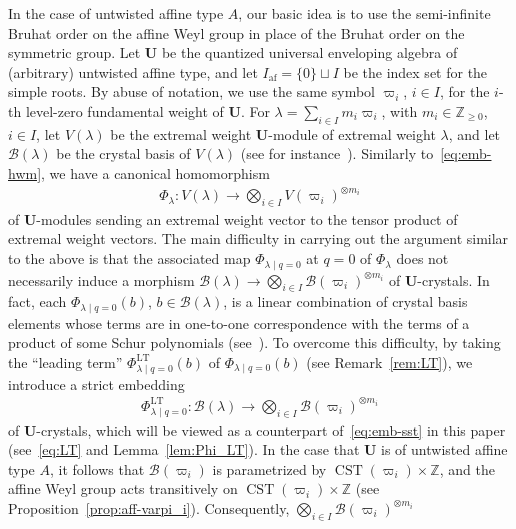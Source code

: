 \documentclass[ALCO,ThmDefs,Unicode,epreuves]{cedram}
\newcommand{\BZ}{\mathbb{Z}}
\renewcommand{\U}{\mathbf{U}}
\DeclareMathOperator{\af}{af}
\DeclareMathOperator{\LT}{LT}
\DeclareMathOperator{\CST}{CST}
\begin{document}
In the case of untwisted affine type $A$, 
our basic idea is to use 
the semi-infinite Bruhat order on the affine Weyl group 
in place of the Bruhat order on the symmetric group. 
Let 
$\U$ 
be the quantized universal enveloping algebra of (arbitrary) untwisted affine type, 
and let 
$I_{\af} = \{ 0 \} \sqcup I$
be the index set for the simple roots.
By abuse of notation, we use the same symbol 
$\varpi_i$, $i \in I$, 
for the $i$-th level-zero fundamental weight of $\U$. 
For 
$\lambda = \sum_{i \in I} m_i \varpi_i$, 
with 
$m_i \in \BZ_{\geq 0}$, $i \in I$, 
let 
$V(\lambda)$ 
be the extremal weight $\U$-module 
of extremal weight $\lambda$, 
and let 
$\mathcal{B}(\lambda)$ 
be the crystal basis of 
$V(\lambda)$ 
(see for instance~\cite[\S~3.1]{K02}). 
Similarly to~\eqref{eq:emb-hwm}, 
we have a canonical homomorphism 
\begin{align}
\Phi_{\lambda} : 
V(\lambda) 
\longrightarrow 
\bigotimes_{i \in I} V(\varpi_i)^{\otimes m_i}
\end{align}
of $\U$-modules sending an extremal weight vector to the tensor product of extremal weight vectors. 
The main difficulty in carrying out the argument similar to the above is that the associated map 
$\Phi_{\lambda \mid q=0}$ 
at 
$q = 0$ 
of 
$\Phi_{\lambda}$ 
does not necessarily induce a morphism 
$\mathcal{B}(\lambda) \rightarrow \bigotimes_{i \in I} \mathcal{B}(\varpi_i)^{\otimes m_i}$
of $\U$-crystals. 
In fact, each 
$\Phi_{\lambda \mid q=0}(b)$, 
$b \in \mathcal{B}(\lambda)$, 
is a linear combination of crystal basis elements 
whose terms are in one-to-one correspondence with 
the terms of a product of some Schur polynomials 
(see~\cite[\S~4.2]{BN04}). 
To overcome this difficulty, 
by taking the ``leading term'' 
$\Phi_{\lambda \mid q=0}^{\LT }(b)$ 
of 
$\Phi_{\lambda \mid q=0}(b)$
(see Remark~\ref{rem:LT}), 
we introduce a strict embedding 
\begin{align} \label{eq:intro-LT}
\Phi_{\lambda \mid q=0}^{\LT } : 
\mathcal{B}(\lambda) 
\longrightarrow 
\bigotimes_{i \in I} \mathcal{B}(\varpi_i)^{\otimes m_i}
\end{align}
of $\U$-crystals, 
which will be viewed as a counterpart of~\eqref{eq:emb-sst} in this paper 
(see~\eqref{eq:LT} and Lemma~\ref{lem:Phi_LT}). 
In the case that $\U$ is of untwisted affine type $A$, 
it follows that 
$\mathcal{B}(\varpi_i)$
is parametrized by 
$\CST (\varpi_i) \times \BZ$, 
and the affine Weyl group acts transitively on 
$\CST (\varpi_i) \times \BZ$ 
(see Proposition~\ref{prop:aff-varpi_i}). 
Consequently, 
$\bigotimes_{i \in I} \mathcal{B}(\varpi_i)^{\otimes m_i}$ 
\end{document}
